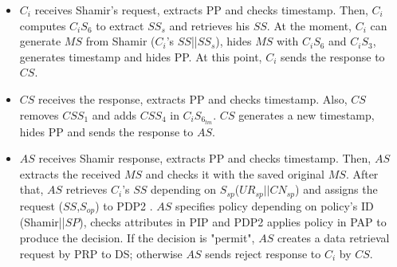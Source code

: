 \documentclass[journal,article,submit,moreauthors,pdftex]{Definitions/mdpi}
\makeatletter
\newcommand\notsotiny{\@setfontsize\notsotiny{6.31415}{7.1828}}
\makeatother
\begin{document}
\begin{itemize}
\begin{itemize}[topsep=0pt,itemsep=-1ex,partopsep=1ex,parsep=1ex]
\begin{itemize}[topsep=0pt,itemsep=-1ex,partopsep=1ex,parsep=1ex]
\begin{enumerate}
\begin{itemize}
\item $C_i$ receives Shamir's request, extracts PP and checks timestamp. Then, $C_i$ computes $C_iS_6$ to extract $SS_s$ and retrieves his $SS$. At the moment, $C_i$ can generate $MS$ from Shamir ($C_i$'s $SS$||$SS_s$), hides $MS$ with $C_iS_6$ and $C_iS_3$, generates timestamp and hides PP. At this point, $C_i$ sends the response to $CS$.
\item $CS$ receives the response, extracts PP and checks timestamp. Also, $CS$ removes $CSS_1$ and adds $CSS_4$ in $C_iS_{6_{tm}}$. $CS$ generates a new timestamp, hides PP and sends the response to $AS$.
\item $AS$ receives Shamir response, extracts PP and checks timestamp. Then, $AS$ extracts the received $MS$ and checks it with the saved original $MS$. After that, $AS$ retrieves $C_i$'s $SS$ depending on $S_{sp}$($UR_{sp}||CN_{sp}$) and assigns the request ($SS$,$S_{op}$) to PDP2 . $AS$ specifies policy depending on policy's ID (Shamir||$SP$), checks attributes in PIP and PDP2 applies policy in PAP to produce the decision. If the decision is "permit", $AS$ creates a data retrieval request by PRP to DS; otherwise $AS$ sends reject response to $C_i$ by $CS$.
\end{itemize}
\begin{figure}[ht]
\centering
\scriptsize
{}
\end{figure}
\end{enumerate}
\end{itemize}
\end{itemize}
\end{itemize}
\end{document}
